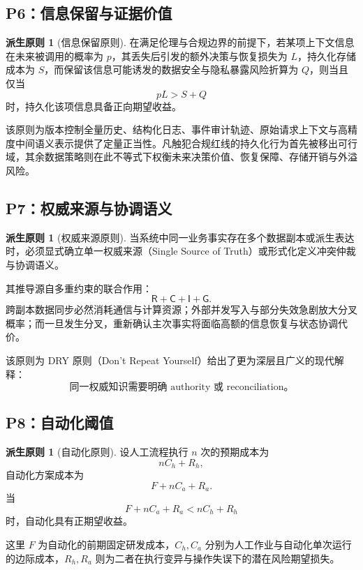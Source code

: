 \documentclass[11pt,a4paper]{ctexart}
\numberwithin{equation}{section}
\theoremstyle{definition}
\newtheorem{principle}[definition]{派生原则}
\theoremstyle{plain}
\newcommand{\Res}{\mathsf{R}}
\newcommand{\Ctrl}{\mathsf{C}}
\newcommand{\Info}{\mathsf{I}}
\newcommand{\Goal}{\mathsf{G}}
\begin{document}
\subsection{P6：信息保留与证据价值}

\begin{principle}[信息保留原则]
在满足伦理与合规边界的前提下，若某项上下文信息在未来被调用的概率为 $p$，其丢失后引发的额外决策与恢复损失为 $L$，持久化存储成本为 $S$，而保留该信息可能诱发的数据安全与隐私暴露风险折算为 $Q$，则当且仅当
\[
pL>S+Q
\]
时，持久化该项信息具备正向期望收益。
\end{principle}

该原则为版本控制全量历史、结构化日志、事件审计轨迹、原始请求上下文与高精度中间语义表示提供了定量正当性。凡触犯合规红线的持久化行为首先被移出可行域，其余数据策略则在此不等式下权衡未来决策价值、恢复保障、存储开销与外溢风险。

\subsection{P7：权威来源与协调语义}

\begin{principle}[权威来源原则]
当系统中同一业务事实存在多个数据副本或派生表达时，必须显式确立单一权威来源（Single Source of Truth）或形式化定义冲突仲裁与协调语义。
\end{principle}

其推导源自多重约束的联合作用：
\[
\Res+\Ctrl+\Info+\Goal.
\]
跨副本数据同步必然消耗通信与计算资源；外部并发写入与部分失效急剧放大分叉概率；而一旦发生分叉，重新确认主次事实将面临高额的信息恢复与状态协调代价。

该原则为 DRY 原则（Don't Repeat Yourself）给出了更为深层且广义的现代解释：
\[
\boxed{\text{同一权威知识需要明确 authority 或 reconciliation。}}
\]

\subsection{P8：自动化阈值}

\begin{principle}[自动化原则]
设人工流程执行 $n$ 次的预期成本为
\[
nC_h+R_h,
\]
自动化方案成本为
\[
F+nC_a+R_a.
\]
当
\[
F+nC_a+R_a<nC_h+R_h
\]
时，自动化具有正期望收益。
\end{principle}

这里 $F$ 为自动化的前期固定研发成本，$C_h,C_a$ 分别为人工作业与自动化单次运行的边际成本，$R_h,R_a$ 则为二者在执行变异与操作失误下的潜在风险期望损失。
\end{document}

